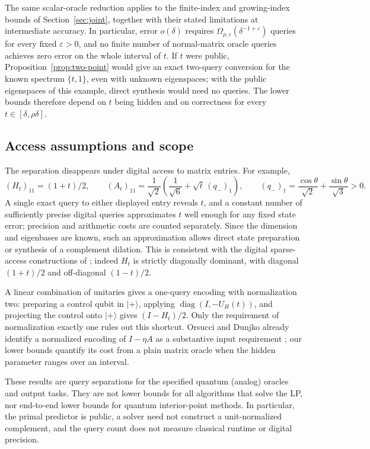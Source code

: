 The same scalar-oracle reduction applies to the finite-index and growing-index bounds of Section~\ref{sec:joint}, together with their stated limitations at intermediate accuracy. In particular, error $o(\delta)$ requires $\Omega_{\rho,\varepsilon}(\delta^{-1+\varepsilon})$ queries for every fixed $\varepsilon>0$, and no finite number of normal-matrix oracle queries achieves zero error on the whole interval of $t$. If $t$ were public, Proposition~\ref{prop:two-point} would give an exact two-query conversion for the known spectrum $\{t,1\}$, even with unknown eigenspaces; with the public eigenspaces of this example, direct synthesis would need no queries. The lower bounds therefore depend on $t$ being hidden and on correctness for every $t\in[\delta,\rho\delta]$.

\subsection{Access assumptions and scope}
The separation disappears under digital access to matrix entries. For example,
\[
 (H_t)_{11}=(1+t)/2,\qquad
 (A_t)_{11}=\frac1{\sqrt2}
 \left(\frac1{\sqrt6}+\sqrt t\,(q_-)_1\right),\qquad
 (q_-)_1=\frac{\cos\theta}{\sqrt2}+\frac{\sin\theta}{\sqrt3}>0.
\]
A single exact query to either displayed entry reveals $t$, and a constant number of sufficiently precise digital queries approximates $t$ well enough for any fixed state error; precision and arithmetic costs are counted separately. Since the dimension and eigenbases are known, such an approximation allows direct state preparation or synthesis of a complement dilation. This is consistent with the digital sparse-access constructions of \citet[Section 4.3]{orsucci2021}; indeed $H_t$ is strictly diagonally dominant, with diagonal $(1+t)/2$ and off-diagonal $(1-t)/2$.

A linear combination of unitaries gives a one-query encoding with normalization two: preparing a control qubit in $|+\rangle$, applying $\operatorname{diag}(I,-U_H(t))$, and projecting the control onto $|+\rangle$ gives $(I-H_t)/2$. Only the requirement of normalization exactly one rules out this shortcut. Orsucci and Dunjko already identify a normalized encoding of $I-\eta A$ as a substantive input requirement \cite[Section 4.3]{orsucci2021}; our lower bounds quantify its cost from a plain matrix oracle when the hidden parameter ranges over an interval.

These results are query separations for the specified quantum (analog) oracles and output tasks. They are not lower bounds for all algorithms that solve the LP, nor end-to-end lower bounds for quantum interior-point methods. In particular, the primal predictor is public, a solver need not construct a unit-normalized complement, and the query count does not measure classical runtime or digital precision.
